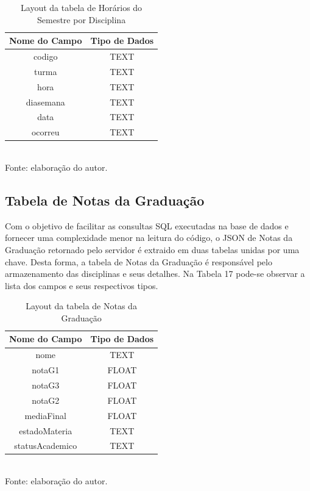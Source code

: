 \begin{table}[!hbt]
\centering
\caption[Aplicação - Tabela de Horários do Semestre por Disciplina]{Layout da tabela de Horários do Semestre por Disciplina}
\vspace{3mm}
\begin{tabular}{c|c}\hline
\textbf{Nome do Campo} & \textbf{Tipo de Dados} \\ \hline
codigo                 & TEXT                   \\ \hline
turma                  & TEXT                   \\ \hline
hora                   & TEXT                   \\ \hline
diasemana              & TEXT                   \\ \hline
data                   & TEXT                   \\ \hline
ocorreu                & TEXT                   \\ \hline
\end{tabular}
\\ Fonte: elaboração do autor.
\end{table}

\subsection{Tabela de Notas da Graduação}
Com o objetivo de facilitar as consultas SQL executadas na base de dados e fornecer uma complexidade menor na leitura do código, o JSON de Notas da Graduação retornado pelo servidor é extraido em duas tabelas unidas por uma chave. Desta forma, a tabela de Notas da Graduação é responsável pelo armazenamento das disciplinas e seus detalhes. Na Tabela 17 pode-se observar a lista dos campos e seus respectivos tipos.

\begin{table}[!hbt]
\centering
\caption[Aplicação - Tabela de Notas da Graduação]{Layout da tabela de Notas da Graduação}
\vspace{3mm}
\begin{tabular}{c|c}\hline
\textbf{Nome do Campo} & \textbf{Tipo de Dados} \\ \hline
nome                   & TEXT                   \\ \hline
notaG1                 & FLOAT                  \\ \hline
notaG3                 & FLOAT                  \\ \hline
notaG2                 & FLOAT                  \\ \hline
mediaFinal             & FLOAT                  \\ \hline
estadoMateria          & TEXT                   \\ \hline
statusAcademico        & TEXT                   \\ \hline
\end{tabular}
\\ Fonte: elaboração do autor.
\end{table}

